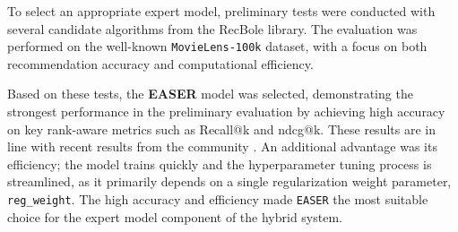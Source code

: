 To select an appropriate expert model, preliminary tests were conducted with several candidate algorithms from the RecBole library. The evaluation was performed on the well-known \texttt{MovieLens-100k} dataset, with a focus on both recommendation accuracy and computational efficiency.

Based on these tests, the \textbf{EASER} model was selected, demonstrating the strongest performance in the preliminary evaluation by achieving high accuracy on key rank-aware metrics such as Recall@k and \acs{ndcg}@k. These results are in line with recent results from the community \cite{SOTA-TOPN-RECSYS}. An additional advantage was its efficiency; the model trains quickly and the hyperparameter tuning process is streamlined, as it primarily depends on a single regularization weight parameter, \texttt{reg\_weight}. The high accuracy and efficiency made \texttt{EASER} the most suitable choice for the expert model component of the hybrid system.